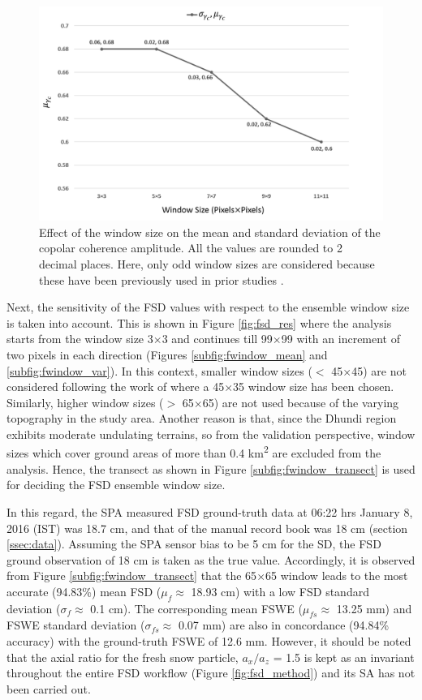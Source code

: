 \documentclass[review]{elsarticle}
\numberwithin{equation}{section}
\numberwithin{figure}{section}
\numberwithin{table}{section}
\begin{document}
\begin{figure}[htb]
    \centering
    \includegraphics[width=\textwidth]{Figures/Results/Coh_FSD.png}
    \caption{Effect of the window size on the mean and standard deviation of the copolar coherence amplitude. All the
values are rounded to 2 decimal places. Here, only odd window sizes are considered because these have been previously used in prior studies \citep{Leinss2018, Leinss2014, Kumar2011}.}
    \label{fig:fsd_coh}
\end{figure}

Next, the sensitivity of the FSD values with respect to the ensemble window size is taken into account. This is shown in Figure \ref{fig:fsd_res} where the analysis starts from the window size 3$\times$3 and continues till 99$\times$99 with an increment of two pixels in each direction (Figures \ref{subfig:fwindow_mean} and \ref{subfig:fwindow_var}). In this context, smaller window sizes ($<$ 45$\times$45) are not considered following the work of \cite{Leinss2014} where a 45$\times$35 window size has been chosen. Similarly, higher window sizes ($>$ 65$\times$65) are not used because of the varying topography in the study area. Another reason is that, since the Dhundi region exhibits moderate undulating terrains, so from the validation perspective, window sizes which cover ground areas of more than 0.4 km\textsuperscript{2} are excluded from the analysis. Hence, the transect as shown in Figure \ref{subfig:fwindow_transect} is used for deciding the FSD ensemble window size.

In this regard, the SPA measured FSD ground-truth data at 06:22 hrs January 8, 2016 (IST) was 18.7 cm, and that of the manual record book was 18 cm (section \ref{ssec:data}). Assuming the SPA sensor bias to be 5 cm for the SD, the FSD ground observation of 18 cm is taken as the true value. Accordingly, it is observed from Figure \ref{subfig:fwindow_transect} that the 65$\times$65 window leads to the most accurate (94.83\%) mean FSD ($\mu_f \approx$ 18.93 cm) with a low FSD standard deviation ($\sigma_f \approx$ 0.1 cm). The corresponding mean FSWE ($\mu_{fs} \approx$ 13.25 mm) and FSWE standard deviation ($\sigma_{fs} \approx$ 0.07 mm) are also in concordance (94.84\% accuracy) with the ground-truth FSWE of 12.6 mm. However, it should be noted that the axial ratio for the fresh snow particle, $a_x/a_z$ = 1.5 is kept as an invariant throughout the entire FSD workflow (Figure \ref{fig:fsd_method}) and its SA has not been carried out.
\end{document}
